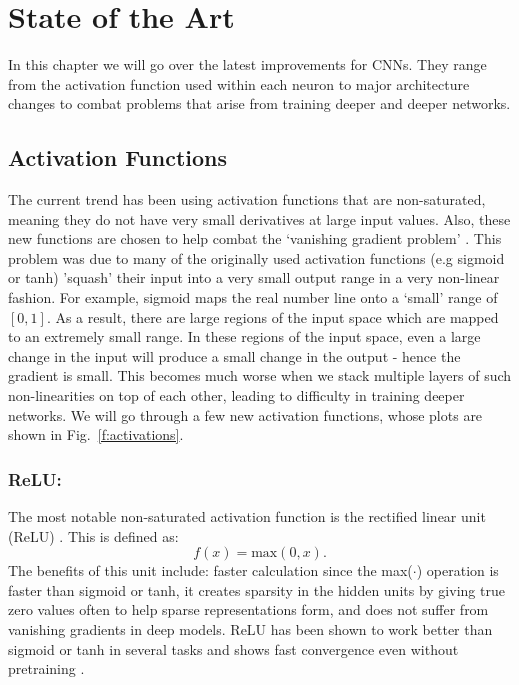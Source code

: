 \chapter{State of the Art}\label{StateOfTheArt}
In this chapter we will go over the latest improvements for CNNs. 
They range from the activation function used within each neuron to major architecture changes to combat problems that arise from training deeper and deeper networks.


\section{Activation Functions}
The current trend has been using activation functions that are non-saturated, meaning they do not have very small derivatives at large input values. 
Also, these new functions are chosen to help combat the `vanishing gradient problem' \cite{hochreiter2001gradient}.
This problem was due to many of the originally used activation functions (e.g sigmoid or tanh) 'squash' their input into a very small output range in a very non-linear fashion. 
For example, sigmoid maps the real number line onto a `small' range of $[0, 1]$. 
As a result, there are large regions of the input space which are mapped to an extremely small range. 
In these regions of the input space, even a large change in the input will produce a small change in the output - hence the gradient is small.
This becomes much worse when we stack multiple layers of such non-linearities on top of each other, leading to difficulty in training deeper networks.
We will go through a few new activation functions, whose plots are shown in Fig.~\ref{f:activations}.

\subsection{ReLU:}
The most notable non-saturated activation function is the rectified linear unit (ReLU) \cite{nair2010rectified}. 
This is defined as:
\begin{equation}
f(x) = \mbox{max}(0,x).
\label{e:relu}
\end{equation}
The benefits of this unit include: faster calculation since the max($\cdot$) operation is faster than sigmoid or tanh, it creates sparsity in the hidden units by giving true zero values often to help sparse representations form, and does not suffer from vanishing gradients in deep models. 
ReLU has been shown to work better than sigmoid or tanh in several tasks and shows fast convergence even without pretraining \cite{glorot2011deep,krizhevsky2012imagenet,zeiler2013rectified,maas2013rectifier}.

